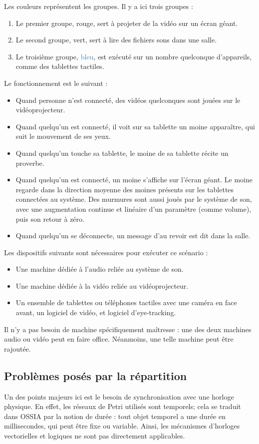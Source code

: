 Les couleurs représentent les groupes.
Il y a ici trois groupes : 

\begin{enumerate}
	\item Le premier groupe, \textcolor{BrickRed}{rouge}, sert à projeter de la vidéo sur un écran géant.
	\item Le second groupe, \textcolor{OliveGreen}{vert}, sert à lire des fichiers sons dans une salle.
	\item Le troisième groupe, \textcolor{SteelBlue}{bleu}, est exécuté sur un nombre quelconque d'appareils, comme des tablettes tactiles.  
\end{enumerate}

Le fonctionnement est le suivant : 
\begin{itemize}
	\item Quand personne n'est connecté, des vidéos quelconques sont jouées sur le vidéoprojecteur.
	\item Quand quelqu'un est connecté, il voit sur sa tablette un moine apparaître, qui suit le mouvement de ses yeux.
	\item Quand quelqu'un touche sa tablette, le moine de sa tablette récite un proverbe.
	\item Quand quelqu'un est connecté, un moine s'affiche sur l'écran géant. Le moine regarde dans la direction moyenne des moines présents sur les tablettes connectées au système. Des murmures sont aussi joués par le système de son, avec une augmentation continue et linéaire d'un paramètre (comme volume), puis son retour à zéro.
	\item Quand quelqu'un se déconnecte, un message d'au revoir est dit dans la salle.
\end{itemize}

Les dispositifs suivants sont nécessaires pour exécuter ce scénario : 
\begin{itemize}
	\item Une machine dédiée à l'audio reliée au système de son.
	\item Une machine dédiée à la vidéo reliée au vidéoprojecteur.
	\item Un ensemble de tablettes ou téléphones tactiles avec une caméra en face avant, un logiciel de vidéo, et logiciel d'eye-tracking.
\end{itemize}

Il n'y a pas besoin de machine spécifiquement maîtresse : une des deux machines audio ou vidéo peut en faire office.
Néanmoins, une telle machine peut être rajoutée.
\subsection{Problèmes posés par la répartition}
\label{section.pbRepart}
Un des points majeurs ici est le besoin de synchronisation avec une horloge physique. En effet, les réseaux de Petri utilisés sont temporels; cela se traduit dans \ac{OSSIA} par la notion de durée : tout objet temporel a une durée en millisecondes, qui peut être fixe ou variable. Ainsi, les mécanismes d'horloges vectorielles et logiques ne sont pas directement applicables.

